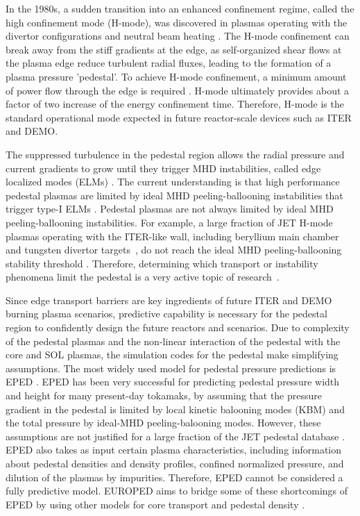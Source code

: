 \documentclass[a4paper, twoside, final, 12pt]{article}
\begin{document}
In the 1980s, a sudden transition into an enhanced confinement regime, called the high confinement mode (H-mode), was discovered in plasmas operating with the divertor configurations and neutral beam heating \cite{PhysRevLett}.
The H-mode confinement can break away from the stiff gradients at the edge, as self-organized shear flows at the plasma edge reduce turbulent radial fluxes, leading to the formation of a plasma pressure 'pedestal'.
To achieve H-mode confinement, a minimum amount of power flow through the edge is required \cite{Martin_2008}. H-mode ultimately provides about a factor of two increase of the energy confinement time. Therefore, H-mode is the standard operational mode expected in future reactor-scale devices such as ITER and DEMO.

The suppressed turbulence in the pedestal region allows the radial pressure  and current gradients to grow until they trigger MHD instabilities, called edge localized modes (ELMs) \cite{ELM_s, Viezzer_2018}.
The current understanding is that high performance pedestal plasmas are limited by ideal MHD peeling-ballooning instabilities that trigger type-I ELMs \cite{ELM_s}.
Pedestal plasmas are not always limited by ideal MHD peeling-ballooning instabilities.
For example, a large fraction of JET H-mode plasmas operating with the ITER-like wall, including beryllium main chamber and tungsten divertor targets~\cite{PHILIPPS20101581}, do not reach the ideal MHD peeling-ballooning stability threshold \cite{Frassinetti_2020}.  Therefore, determining which transport or instability phenomena limit the pedestal is a very active topic of research~\cite{electron_transport, Catto_2013, Kotschenreuther_2019}.

Since edge transport barriers are key ingredients of future ITER and DEMO burning plasma scenarios, predictive capability is necessary for the pedestal region to confidently design the future reactors and scenarios.
Due to complexity of the pedestal plasmas and the non-linear interaction of the pedestal with the core and SOL plasmas, the simulation codes for the pedestal make simplifying assumptions. The most widely used model for pedestal pressure predictions is EPED \cite{EPED_ELM, Snyder_2011}. 
EPED has been very successful for predicting pedestal pressure width and height for many present-day tokamaks, by assuming that the pressure gradient in the pedestal is limited by local kinetic balooning modes (KBM) and the total pressure by ideal-MHD peeling-balooning modes. However, these assumptions are not justified for a large fraction of the JET pedestal database \cite{Frassinetti_2020}. EPED also takes as input certain plasma characteristics, including information about pedestal densities and density profiles, confined normalized pressure, and dilution of the plasmas by impurities. Therefore, EPED cannot be considered a fully predictive model. EUROPED aims to bridge some of these shortcomings of EPED by using other models for core transport and pedestal density \cite{Saarelma_2017, pedestal_prediction}. 
\end{document}
